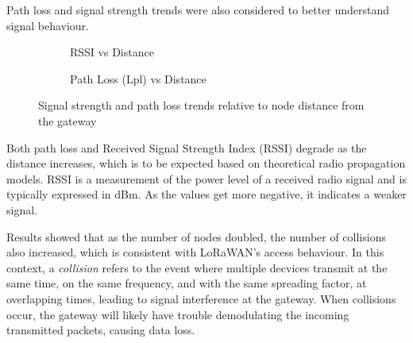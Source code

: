 \vspace{1em} \noindent Path loss and signal strength trends were also considered to better understand signal behaviour.
\begin{figure}[H]
\centering
\begin{subfigure}{0.48\textwidth}
	\centering
	
	\caption{RSSI vs Distance}
	\label{fig:rssi_vs_distance}
\end{subfigure}
\hfill
\begin{subfigure}{0.48\textwidth}
	\centering
	
	\caption{Path Loss (Lpl) vs Distance}
	\label{fig:lpl_vs_distance}
\end{subfigure}
\caption{Signal strength and path loss trends relative to node distance from the gateway}
\end{figure}

Both path loss and Received Signal Strength Index (RSSI) degrade as the distance increases, which is to be expected based on theoretical radio propagation models. RSSI is a measurement of the power level of a received radio signal and is typically expressed in dBm. As the values get more negative, it indicates a weaker signal.

Results showed that as the number of nodes doubled, the number of collisions also increased, which is consistent with LoRaWAN's access behaviour. In this context, a \textit{collision} refers to the event where multiple decvices transmit at the same time, on the same frequency, and with the same spreading factor, at overlapping times, leading to signal interference at the gateway. When collisions occur, the gateway will likely have trouble demodulating the incoming transmitted packets, causing data loss.

